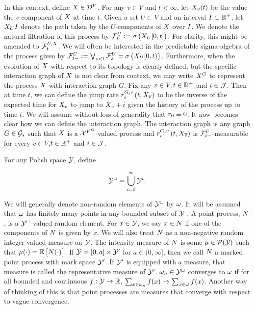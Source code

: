 \ind In this context, define \(X \in \mathcal{D}^{V}\). For any \(v \in V\) and \(t < \infty\), let \(X_{v}(t)\) be the value the \(v\)-component of \(X\) at time \(t\). Given a set \(U\subset V\) and an interval \(I \subset \mathbb{R}^+\), let \(X_{U}I\) denote the path taken by the \(U\)-components of \(X\) over \(I\). We denote the natural filtration of this process by \(\mathcal{F}^{U}_{t} := \sigma \left(X_{U}[0,t]\right)\). For clarity, this might be amended to \(\mathcal{F}^{U,X}_{t}\). We will often be interested in the predictable sigma-algebra of the process given by \(\mathcal{F}^{U}_{t-} := \bigvee_{s < t} \mathcal{F}^{U}_{s} = \sigma\left(X_{U}[0,t)\right)\). Furthermore, when the evolution of \(X\) with respect to its topology is clearly defined, but the specific interaction graph of \(X\) is not clear from context, we may write \(X^{G}\) to represent the process \(X\) with interaction graph \(G\). Fix any \(v \in V,t \in \mathbb{R}^+\) and \(i \in \mathcal{J}\). Then at time \(t\), we can define the jump rate \(\rate\gvpara{G}{v}\stpara{i}\tmepro{t}{\Xf\vind{\cl{v}}}{}\) to be the inverse of the expected time for \(X_{v}\) to jump to \(X_{v} + i\) given the history of the process up to time \(t\). We will assume without loss of generality that \(r_{0}\equiv 0\). It now becomes clear how we can define the interaction graph. The interaction graph is any graph \(G\in \mathcal{G}_\ast\) such that \(X\) is a \(\mathcal{X}^{V^{G}}\)-valued process and \(\rate\gvpara{G}{v}\stpara{i}\tmepro{t}{\Xf\vind{\cl{v}}}{}\) is \(\mathcal{F}^{\overline{v}}_{t-}\)-measurable for every \(v \in V\),\(t\in \mathbb{R}^+\) and \(i \in \mathcal{J}\). 

\ind {} For any Polish space \(\mathcal{Y}\), define

\[\mathcal{Y}^\sqcup = \bigcup_{i=0}^\infty \mathcal{Y}^i.\]

We will generally denote non-random elements of \(\mathcal{Y}^\sqcup\) by \(\omega\). It will be assumed that \(\omega\) has finitely many points in any bounded subset of \(\mathcal{Y}\) . A point process, \(N\), is a \(\mathcal{Y}^\sqcup\)-valued random element. For \(x \in \mathcal{Y}\), we say \(x \in N\) if one of the components of \(N\) is given by \(x\). We will also treat \(N\) as a non-negative random integer valued measure on \(\mathcal{Y}\). The intensity measure of \(N\) is some \(\mu\in \mathcal{P}(\mathcal{Y})\) such that \(\mu(\cdot) = \mathbb{E}\left[N(\cdot)\right]\). If \(\mathcal{Y} = [0,a]\times \mathcal{Y}'\) for \(a \in (0,\infty]\), then we call \(N\) a marked point process with mark space \(\mathcal{Y}'\). If \(\mathcal{Y}'\) is equipped with a measure, that measure is called the representative measure of \(\mathcal{Y}'\). \(\omega_{n} \in \mathcal{Y}^\sqcup\) converges to \(\omega\) if for all bounded and continuous \(f: \mathcal{Y} \rightarrow \mathbb{R}\), \(\sum_{x \in \omega_{n}} f(x) \rightarrow \sum_{x \in \omega} f(x)\). Another way of thinking of this is that point processes are measures that converge with respect to vague convergence.

